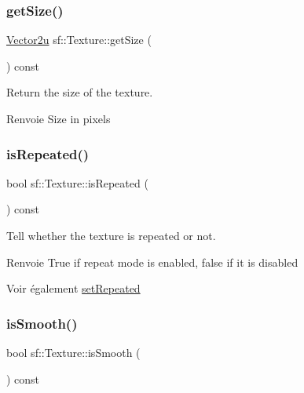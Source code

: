 \subsubsection{\texorpdfstring{get\+Size()}{getSize()}}
{\footnotesize\ttfamily \hyperlink{classsf_1_1Vector2}{Vector2u} sf\+::\+Texture\+::get\+Size (\begin{DoxyParamCaption}{ }\end{DoxyParamCaption}) const}



Return the size of the texture. 

\begin{DoxyReturn}{Renvoie}
Size in pixels 
\end{DoxyReturn}
\mbox{\label{classsf_1_1Texture_af1a1a32ca5c799204b2bea4040df7647}} 
\subsubsection{\texorpdfstring{is\+Repeated()}{isRepeated()}}
{\footnotesize\ttfamily bool sf\+::\+Texture\+::is\+Repeated (\begin{DoxyParamCaption}{ }\end{DoxyParamCaption}) const}



Tell whether the texture is repeated or not. 

\begin{DoxyReturn}{Renvoie}
True if repeat mode is enabled, false if it is disabled
\end{DoxyReturn}
\begin{DoxySeeAlso}{Voir également}
\hyperlink{classsf_1_1Texture_aaa87d1eff053b9d4d34a24c784a28658}{set\+Repeated} 
\end{DoxySeeAlso}
\mbox{\label{classsf_1_1Texture_a3ebb050b5a71e1d40ba66eb1a060e103}} 
\subsubsection{\texorpdfstring{is\+Smooth()}{isSmooth()}}
{\footnotesize\ttfamily bool sf\+::\+Texture\+::is\+Smooth (\begin{DoxyParamCaption}{ }\end{DoxyParamCaption}) const}



